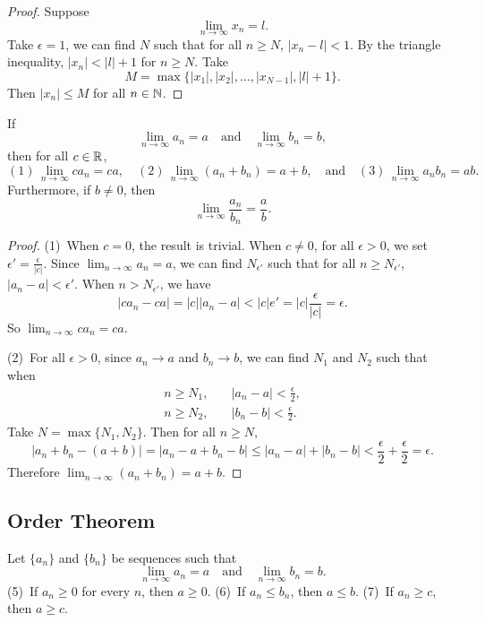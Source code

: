 \begin{proof}
  Suppose
  \[
    \lim_{n \to \infty} x_n = l
  .\]
  Take $\epsilon = 1$, we can find $N$ such that for all
  $n \ge N$, $|x_n - l| < 1$. By the triangle inequality,
  $|x_n| < |l| + 1$ for $n \ge N$. Take
  \[M = \max\{|x_1|, |x_2|, \dots, |x_{N - 1}|, |l| + 1\}.\]
  Then $|x_n| \le M$ for all $n \in \mathbb{N}$.
\end{proof}

\begin{theorem}
  If
  \[
    \lim_{n \to \infty} a_n = a \quad \text{and} \quad
    \lim_{n \to \infty} b_n = b
  ,\]
  then for all $c \in \mathbb{R}$,
  \[
    (1)\, \lim_{n \to \infty} ca_n = ca, \quad
    (2)\, \lim_{n \to \infty} (a_n + b_n) = a + b, \quad \text{and} \quad
    (3)\, \lim_{n \to \infty} a_nb_n = ab
  .\]
  Furthermore, if $b \ne 0$, then
  \[
    \lim_{n \to \infty} \frac{a_n}{b_n} = \frac{a}{b} \tag{4}
  .\]
\end{theorem}

\begin{proof}
  (1)\, When $c = 0$, the result is trivial. When $c \ne 0$, for
  all $\epsilon > 0$, we set
  $\epsilon' = \frac{\epsilon}{|c|}$.
  Since $\lim_{n \to \infty} a_n = a$, we can find
  $N_{\epsilon'}$ such that for all $n \ge N_{\epsilon'}$,
  $|a_n - a| < \epsilon'$.
  When $n > N_{\epsilon'}$, we have
  \[
  |ca_n - ca| = |c||a_n - a| < |c|e' = |c| \frac{\epsilon}{|c|} = \epsilon
  .\]
  So $\lim_{n \to \infty} ca_n = ca$.

  (2)\, For all $\epsilon > 0$, since $a_n \to a$ and $b_n \to b$,
  we can find $N_1$ and $N_2$ such that when
  \begin{align*}
    n \ge N_1, &\quad |a_n - a| < \frac{\epsilon}{2}, \\
    n \ge N_2, &\quad |b_n - b| < \frac{\epsilon}{2}.
  \end{align*}
  Take $N = \max\{N_1, N_2\}$. Then for all $n \ge N$,
   \[
  |a_n + b_n - (a + b)| = |a_n - a + b_n - b| \le
  |a_n - a| + |b_n - b| < \frac{\epsilon}{2} + \frac{\epsilon}{2}
  = \epsilon
  .\]
  Therefore $\lim_{n \to \infty} (a_n + b_n) = a + b$.
\end{proof}

\subsection{Order Theorem}
\begin{theorem}
  Let $\{a_n\}$ and $\{b_n\}$ be sequences such that
  \[
    \lim_{n \to \infty} a_n = a \quad \text{and} \quad
    \lim_{n \to \infty} b_n = b
  .\]
  (5)\, If $a_n \ge 0$ for every $n$, then $a \ge 0$.
  (6)\, If $a_n \le b_n$, then $a \le b$.
  (7)\, If $a_n \ge c$, then $a \ge c$.
\end{theorem}

